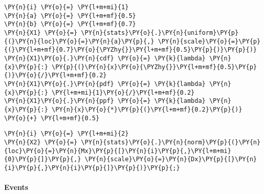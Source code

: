     \begin{tcolorbox}[breakable, size=fbox, boxrule=1pt, pad at break*=1mm,colback=cellbackground, colframe=cellborder]
\begin{Verbatim}[commandchars=\\\{\}]
\PY{n}{i} \PY{o}{=} \PY{l+m+mi}{1} 
\PY{n}{a} \PY{o}{=} \PY{l+m+mf}{0.5}
\PY{n}{b} \PY{o}{=} \PY{l+m+mf}{0.7}
\PY{n}{X1} \PY{o}{=} \PY{n}{stats}\PY{o}{.}\PY{n}{uniform}\PY{p}{(}\PY{n}{loc}\PY{o}{=}\PY{n}{a}\PY{p}{,} \PY{n}{scale}\PY{o}{=}\PY{p}{(}\PY{l+m+mf}{0.7}\PY{o}{\PYZhy{}}\PY{l+m+mf}{0.5}\PY{p}{)}\PY{p}{)}
\PY{n}{X1}\PY{o}{.}\PY{n}{cdf} \PY{o}{=} \PY{k}{lambda} \PY{n}{x}\PY{p}{:} \PY{p}{(}\PY{n}{x}\PY{o}{\PYZhy{}}\PY{l+m+mf}{0.5}\PY{p}{)}\PY{o}{/}\PY{l+m+mf}{0.2}
\PY{n}{X1}\PY{o}{.}\PY{n}{pdf} \PY{o}{=} \PY{k}{lambda} \PY{n}{x}\PY{p}{:} \PY{l+m+mi}{1}\PY{o}{/}\PY{l+m+mf}{0.2}
\PY{n}{X1}\PY{o}{.}\PY{n}{ppf} \PY{o}{=} \PY{k}{lambda} \PY{n}{x}\PY{p}{:} \PY{n}{x}\PY{o}{*}\PY{p}{(}\PY{l+m+mf}{0.2}\PY{p}{)} \PY{o}{+} \PY{l+m+mf}{0.5}
\end{Verbatim}
\end{tcolorbox}

    \begin{tcolorbox}[breakable, size=fbox, boxrule=1pt, pad at break*=1mm,colback=cellbackground, colframe=cellborder]
\begin{Verbatim}[commandchars=\\\{\}]
\PY{n}{i} \PY{o}{=} \PY{l+m+mi}{2}
\PY{n}{X2} \PY{o}{=} \PY{n}{stats}\PY{o}{.}\PY{n}{norm}\PY{p}{(}\PY{n}{loc}\PY{o}{=}\PY{n}{Mx}\PY{p}{[}\PY{n}{i}\PY{p}{,}\PY{l+m+mi}{0}\PY{p}{]}\PY{p}{,} \PY{n}{scale}\PY{o}{=}\PY{n}{Dx}\PY{p}{[}\PY{n}{i}\PY{p}{,}\PY{n}{i}\PY{p}{]}\PY{p}{)}\PY{p}{;}
\end{Verbatim}
\end{tcolorbox}

    \hypertarget{events}{%
\paragraph{Events}\label{events}}

